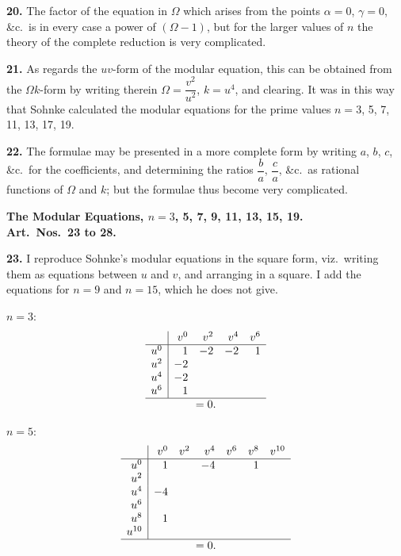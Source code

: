 \documentclass[11pt,a4paper]{article}
\theoremstyle{plain}
\begin{document}
\medskip
\noindent\textbf{20.} The factor of the equation in $\Omega$ which arises from the points $\alpha = 0$, $\gamma = 0$, \&c.\ is in every case a power of $(\Omega - 1)$, but for the larger values of $n$ the theory of the complete reduction is very complicated.

\medskip
\noindent\textbf{21.} As regards the $uv$-form of the modular equation, this can be obtained from the $\Omega k$-form by writing therein $\Omega = \dfrac{v^2}{u^2}$, $k = u^4$, and clearing. It was in this way that Sohnke calculated the modular equations for the prime values $n = 3$, 5, 7, 11, 13, 17, 19.

\medskip
\noindent\textbf{22.} The formulae may be presented in a more complete form by writing $a$, $b$, $c$, \&c.\ for the coefficients, and determining the ratios $\dfrac{b}{a}$, $\dfrac{c}{a}$, \&c.\ as rational functions of $\Omega$ and $k$; but the formulae thus become very complicated.

\medskip
\noindent\textbf{The Modular Equations, $n = 3$, 5, 7, 9, 11, 13, 15, 19.}\\
\textbf{Art.~Nos.~23 to 28.}

\medskip
\noindent\textbf{23.} I reproduce Sohnke's modular equations in the square form, viz.\ writing them as equations between $u$ and $v$, and arranging in a square. I add the equations for $n = 9$ and $n = 15$, which he does not give.

\medskip
$n = 3$:
\[
\begin{array}{r|rrrr}
& v^0 & v^2 & v^4 & v^6 \\
\hline
u^0 & 1 & -2 & -2 & 1 \\
u^2 & -2 & & & \\
u^4 & -2 & & & \\
u^6 & 1 & & & \\
\hline
\multicolumn{5}{c}{= 0.}
\end{array}
\]

$n = 5$:
\[
\begin{array}{r|rrrrrr}
& v^0 & v^2 & v^4 & v^6 & v^8 & v^{10} \\
\hline
u^0 & 1 & & -4 & & 1 & \\
u^2 & & & & & & \\
u^4 & -4 & & & & & \\
u^6 & & & & & & \\
u^8 & 1 & & & & & \\
u^{10} & & & & & & \\
\hline
\multicolumn{7}{c}{= 0.}
\end{array}
\]
\end{document}
